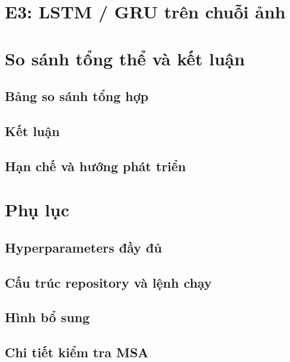 \documentclass[a4paper,12pt]{article}
\begin{document}
\section{E3: LSTM / GRU trên chuỗi ảnh}
\label{sec:e3}

\section{So sánh tổng thể và kết luận}
\label{sec:conclusion}
\subsection{Bảng so sánh tổng hợp}
\subsection{Kết luận}
\subsection{Hạn chế và hướng phát triển}




\appendix
\section{Phụ lục}
\label{sec:appendix}
\subsection{Hyperparameters đầy đủ}
\subsection{Cấu trúc repository và lệnh chạy}
\subsection{Hình bổ sung}
\subsection{Chi tiết kiểm tra MSA}
\end{document}
